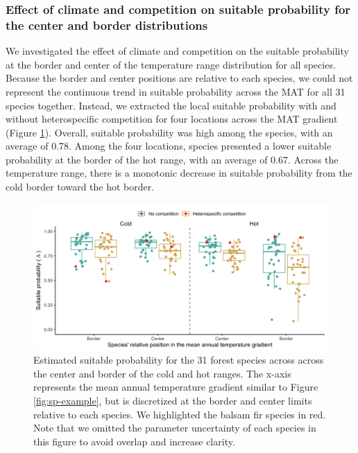 \hypertarget{effect-of-climate-and-competition-on-suitable-probability-for-the-center-and-border-distributions}{%
\subsubsection{Effect of climate and competition on suitable probability
for the center and border
distributions}\label{effect-of-climate-and-competition-on-suitable-probability-for-the-center-and-border-distributions}}

We investigated the effect of climate and competition on the suitable
probability at the border and center of the temperature range
distribution for all species. Because the border and center positions
are relative to each species, we could not represent the continuous
trend in suitable probability across the MAT for all 31 species
together. Instead, we extracted the local suitable probability with and
without heterospecific competition for four locations across the MAT
gradient (Figure \ref{fig:sp_comp_vs_nocomp2}). Overall, suitable
probability was high among the species, with an average of 0.78. Among
the four locations, species presented a lower suitable probability at
the border of the hot range, with an average of 0.67. Across the
temperature range, there is a monotonic decrease in suitable probability
from the cold border toward the hot border.

\hypertarget{fig:sp_comp_vs_nocomp2}{%
\begin{figure}
\centering
\includegraphics[width=1\textwidth,height=\textheight]{manuscript/figs/fig-sp_comp_vs_nocomp2-1.png}
\caption[{Estimated suitable probability for the 31 forest species
across across the center and border of the cold and hot
ranges.}]{Estimated suitable probability for the 31 forest species
across across the center and border of the cold and hot ranges. The
x-axis represents the mean annual temperature gradient similar to Figure
\ref{fig:sp-example}, but is discretized at the border and center limits
relative to each species. We highlighted the balsam fir species in red.
Note that we omitted the parameter uncertainty of each species in this
figure to avoid overlap and increase clarity.}
\label{fig:sp_comp_vs_nocomp2}
\end{figure}
}

